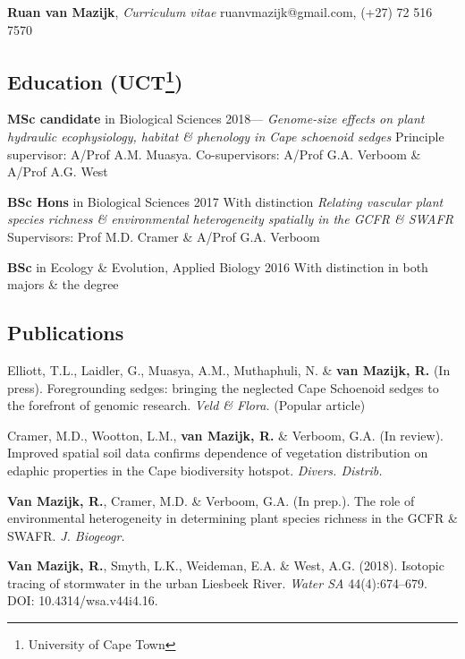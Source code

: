 \documentclass[10pt]{article}
\begin{document}
{\Large
\textbf{Ruan van Mazijk}, \textit{Curriculum vitae}
  \hfill ruanvmazijk@gmail.com, (+27) 72 516 7570
}

\hrulefill

\subsection*{Education (UCT\footnote{University of Cape Town})} %

\begin{hangparas}{2em}{1}

\textbf{MSc candidate} in Biological Sciences \hfill 2018--- \break
\textit{Genome-size effects on plant hydraulic ecophysiology, habitat \&
  phenology in Cape schoenoid sedges} \break
Principle supervisor: A/Prof A.M. Muasya. Co-supervisors: A/Prof G.A. Verboom
 \& A/Prof A.G. West

\textbf{BSc Hons} in Biological Sciences \hfill 2017 \break
With distinction \break
\textit{Relating vascular plant species richness \& environmental heterogeneity
  spatially in the GCFR \& SWAFR} \break
Supervisors: Prof M.D. Cramer \& A/Prof G.A. Verboom

\textbf{BSc} in Ecology \& Evolution, Applied Biology \hfill 2016 \break
With distinction in both majors \& the degree

\hfill

\end{hangparas}

\subsection*{Publications} %

\begin{hangparas}{2em}{1}

Elliott, T.L., Laidler, G., Muasya, A.M., Muthaphuli, N. \& \textbf{van Mazijk, 
R.} (In press). Foregrounding sedges: bringing the neglected Cape Schoenoid 
sedges to the forefront of genomic research. \textit{Veld \& Flora.} (Popular 
article)

Cramer, M.D., Wootton, L.M., \textbf{van Mazijk, R.} \& Verboom, G.A. (In 
review). Improved spatial soil data confirms dependence of vegetation 
distribution on edaphic properties in the Cape biodiversity hotspot. \textit{
Divers. Distrib.}

\textbf{Van Mazijk, R.}, Cramer, M.D. \& Verboom, G.A. (In prep.). The role of
environmental heterogeneity in determining plant species richness in the GCFR \&
SWAFR. \textit{J. Biogeogr.}

\textbf{Van Mazijk, R.}, Smyth, L.K., Weideman, E.A. \& West, A.G. (2018).
Isotopic tracing of stormwater in the urban Liesbeek River. \textit{Water SA}
44(4):674--679. DOI: 10.4314/wsa.v44i4.16.


\hfill

\end{hangparas}
\end{document}
